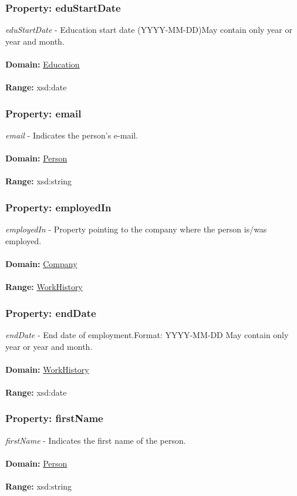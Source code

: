 \documentclass[a4paper,12pt]{article}
\numberwithin{equation}{section}
\begin{document}
\subsubsection{Property: eduStartDate}\hypertarget{eduStartDate}{}
\textit{eduStartDate} - Education start date (YYYY-MM-DD)May contain only year or year and month.
\\\\
\textbf{Domain:} \hyperlink{Education}{Education} 
\\\\
\textbf{Range:}  xsd:date

\subsubsection{Property: email}\hypertarget{email}{}
\textit{email} - Indicates the person's e-mail.
\\\\
\textbf{Domain:} \hyperlink{Person}{Person} 
\\\\
\textbf{Range:}  xsd:string

\subsubsection{Property: employedIn}\hypertarget{employedIn}{}
\textit{employedIn} - Property pointing to the company where the person is/was employed.
\\\\
\textbf{Domain:} \hyperlink{Company}{Company} 
\\\\
\textbf{Range:}  \hyperlink{WorkHistory}{WorkHistory} 

\subsubsection{Property: endDate}\hypertarget{endDate}{}
\textit{endDate} - End date of employment.Format: YYYY-MM-DD May contain only year or year and month.
\\\\
\textbf{Domain:} \hyperlink{WorkHistory}{WorkHistory} 
\\\\
\textbf{Range:}  xsd:date 

\subsubsection{Property: firstName}\hypertarget{firstName}{}
\textit{firstName} - Indicates the first name of the person.
\\\\
\textbf{Domain:} \hyperlink{Person}{Person} 
\\\\
\textbf{Range:}  xsd:string
\end{document}
